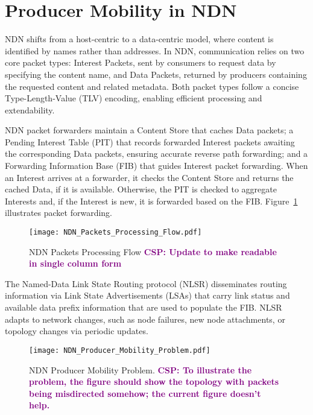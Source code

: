 \documentclass[10pt,conference]{IEEEtran}
\newcommand{\csp}[1]{\textbf{\textcolor{purple}{CSP: #1}}}
\begin{document}
\section{Producer Mobility in NDN}
\label{sec:problem}

NDN shifts from a host-centric to a data-centric model, where content is identified by names rather than addresses. In NDN, communication relies on two core packet types: Interest Packets, sent by consumers to request data by specifying the content name, and Data Packets, returned by producers containing the requested content and related metadata. Both packet types follow a concise Type-Length-Value (TLV) encoding, enabling efficient processing and extendability.

NDN packet forwarders maintain a Content Store that caches Data packets; a Pending Interest Table (PIT) that records forwarded Interest packets awaiting the corresponding Data packets, ensuring accurate reverse path forwarding; and a Forwarding Information Base (FIB) that guides Interest packet forwarding.
When an Interest arrives at a forwarder, it checks the Content Store and returns the cached Data, if it is available. Otherwise, the PIT is checked to aggregate Interests and, if the Interest is new, it is forwarded based on the FIB. Figure~\ref{fig:NDN Packets Processing Flow} illustrates packet forwarding.

\begin{figure}[t]
    \centering
    \texttt{[image: NDN\_Packets\_Processing\_Flow.pdf]}
    \caption{NDN Packets Processing Flow \csp{Update to make readable in single column form}}
    \label{fig:NDN Packets Processing Flow}
\end{figure}

The Named-Data Link State Routing protocol (NLSR) disseminates routing information via Link State Advertisements (LSAs) that carry link status and available data prefix information that are used to populate the FIB. NLSR adapts to network changes, such as node failures, new node attachments, or topology changes via periodic updates.

\begin{figure}[t]
    \centering
    \texttt{[image: NDN\_Producer\_Mobility\_Problem.pdf]}
    \caption{NDN Producer Mobility Problem. \csp{To illustrate the problem, the figure should show the topology with packets being misdirected somehow; the current figure doesn't help.}}
    \label{fig:NDN Producer Mobility Problem}
\end{figure}
\end{document}
